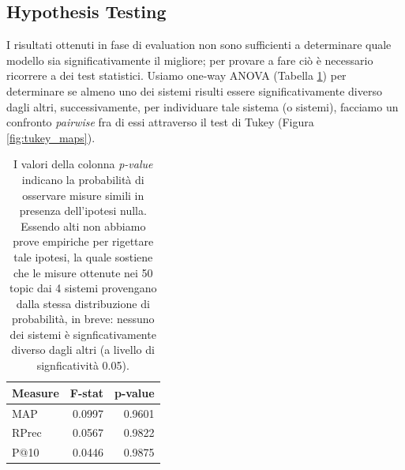 \documentclass[letterpaper, 10 pt, conference]{ieeeconf}  %
\begin{document}
\subsection{Hypothesis Testing}
I risultati ottenuti in fase di evaluation non sono sufficienti a determinare quale modello sia significativamente il migliore; per provare a fare ciò è necessario ricorrere a dei test statistici. Usiamo one-way ANOVA (Tabella \ref{tab:anova}) per determinare se almeno uno dei sistemi risulti essere significativamente diverso dagli altri, successivamente, per individuare tale sistema (o sistemi), facciamo un confronto \textit{pairwise} fra di essi attraverso il test di Tukey (Figura \ref{fig:tukey_maps}).

\begin{table}[h]
\centering
\begin{tabular}{|l|r|r|}
\hline
\textbf{Measure} & \textbf{F-stat} & \textbf{p-value} \\ \hline
MAP              & 0.0997          & 0.9601           \\
RPrec            & 0.0567          & 0.9822           \\ 
P@10             & 0.0446          & 0.9875           \\
\hline
\end{tabular}
\caption{I valori della colonna \textit{p-value} indicano la probabilità di osservare misure simili in presenza dell'ipotesi nulla. Essendo alti non abbiamo prove empiriche per rigettare tale ipotesi, la quale sostiene che le misure ottenute nei 50 topic dai 4 sistemi provengano dalla stessa distribuzione di probabilità, in breve: nessuno dei sistemi è signficativamente diverso dagli altri (a livello di signficatività 0.05).}
\label{tab:anova}
\end{table}
\end{document}
